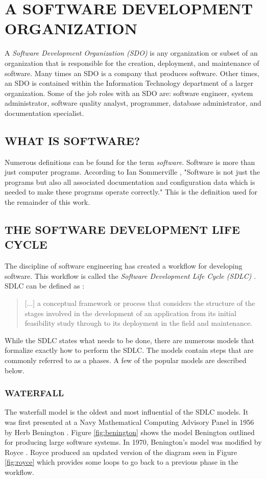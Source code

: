 \documentclass[SDSUThesis.tex]{subfiles}
\begin{document}
\section{A SOFTWARE DEVELOPMENT ORGANIZATION}
A \textit{Software Development Organization (SDO)} is any organization or subset of an organization that is responsible
for the creation, deployment, and maintenance of software.  Many times an SDO
is a company that produces software.  Other times, an SDO is contained
within the Information Technology department of a larger organization. Some of the job roles
with an SDO are: software engineer, system administrator, software quality analyst,
programmer, database administrator, and documentation specialist.


\subsection{WHAT IS SOFTWARE?}
Numerous definitions can be found for the term \textit{software}.
Software is more than just computer programs. According to Ian Sommerville \cite{Sommerville2001}, 
"Software is not just the programs but also all associated documentation and configuration data which is needed to make these programs operate correctly."
This is the definition used for the remainder of this work.


\subsection{THE SOFTWARE DEVELOPMENT LIFE CYCLE}
    The discipline of software engineering has created a workflow for developing
    software.  
    This workflow is called the \textit{Software Development Life Cycle (SDLC)}
    .
    SDLC can be defined as \cite{Ruparelia2010}:
    \begin{quote}
     [...] a conceptual framework or process that considers the structure of the stages
     involved in the development of an application from its initial feasibility study
     through to its deployment in the field and maintenance.
    \end{quote}
    While the SDLC states what needs to be done, there are numerous models 
    that formalize exactly how to perform the SDLC.  The models contain
    steps that are commonly referred to as a phases. A few of the popular
    models are described below.
    
    
    \subsubsection{WATERFALL}
        The waterfall model is the oldest and most influential of the SDLC models. 
        It was first presented at a Navy Mathematical Computing Advisory Panel in 1956
        by Herb Benington \cite{Benington1987}. Figure \ref{fig:benington} shows
        the model Benington outlined for producing large software systems.  
        In 1970, Benington's model was modified by Royce \cite{Royce1987}.  Royce
        produced an updated version of the diagram seen in Figure \ref{fig:royce}
        which provides some loops to go back to a previous phase in the workflow.
    
\end{document}
